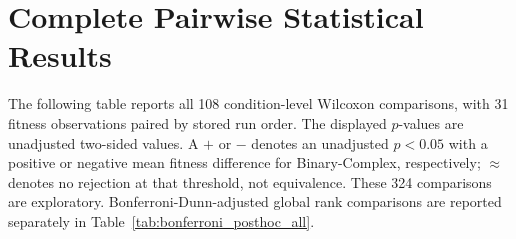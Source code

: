 \documentclass[journal,article,submit,moreauthors]{Definitions/mdpi}
\begin{document}
\clearpage
\section{Complete Pairwise Statistical Results}
\label{sec:appendix_statistics}

The following table reports all 108 condition-level Wilcoxon comparisons,
with 31 fitness observations paired by stored run order. The displayed
$p$-values are unadjusted two-sided values. A $+$ or $-$ denotes an
unadjusted $p<0.05$ with a positive or negative mean fitness difference
for Binary-Complex, respectively; $\approx$ denotes no rejection at
that threshold, not equivalence. These 324 comparisons are exploratory.
Bonferroni-Dunn-adjusted global rank comparisons are reported separately
in Table~\ref{tab:bonferroni_posthoc_all}.
\end{document}
